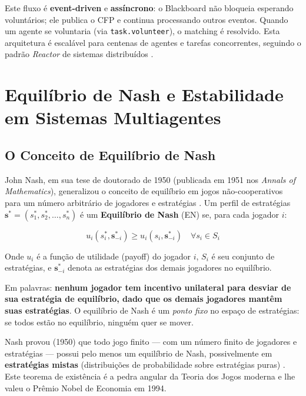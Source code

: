 Este fluxo é \textbf{event-driven} e \textbf{assíncrono}: o Blackboard não bloqueia esperando voluntários; ele publica o CFP e continua processando outros eventos. Quando um agente se voluntaria (via \texttt{task.volunteer}), o matching é resolvido. Esta arquitetura é escalável para centenas de agentes e tarefas concorrentes, seguindo o padrão \textit{Reactor} de sistemas distribuídos \cite{schmidt2000pattern}.

\section{Equilíbrio de Nash e Estabilidade em Sistemas Multiagentes}

\subsection{O Conceito de Equilíbrio de Nash}

John Nash, em sua tese de doutorado de 1950 (publicada em 1951 nos \textit{Annals of Mathematics}), generalizou o conceito de equilíbrio em jogos não-cooperativos para um número arbitrário de jogadores e estratégias \cite{nash1950equilibrium, nash1951non}. Um perfil de estratégias $\mathbf{s}^* = (s_1^*, s_2^*, \ldots, s_n^*)$ é um \textbf{Equilíbrio de Nash} (EN) se, para cada jogador $i$:

\begin{equation}\label{eq:nash_definition}
u_i(s_i^*, \mathbf{s}_{-i}^*) \geq u_i(s_i, \mathbf{s}_{-i}^*) \quad \forall s_i \in S_i
\end{equation}

Onde $u_i$ é a função de utilidade (payoff) do jogador $i$, $S_i$ é seu conjunto de estratégias, e $\mathbf{s}_{-i}^*$ denota as estratégias dos demais jogadores no equilíbrio.

Em palavras: \textbf{nenhum jogador tem incentivo unilateral para desviar de sua estratégia de equilíbrio, dado que os demais jogadores mantêm suas estratégias}. O equilíbrio de Nash é um \textit{ponto fixo} no espaço de estratégias: se todos estão no equilíbrio, ninguém quer se mover.

Nash provou (1950) que todo jogo finito --- com um número finito de jogadores e estratégias --- possui pelo menos um equilíbrio de Nash, possivelmente em \textbf{estratégias mistas} (distribuições de probabilidade sobre estratégias puras) \cite{nash1950equilibrium}. Este teorema de existência é a pedra angular da Teoria dos Jogos moderna e lhe valeu o Prêmio Nobel de Economia em 1994.

